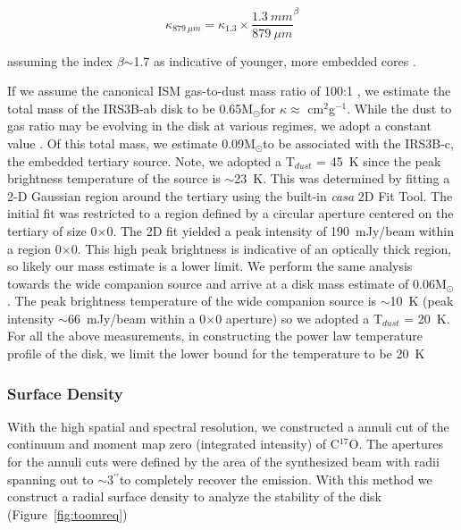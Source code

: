 \documentclass[preprint,12pt]{aastex62}
\newcommand{\cso}{C$^{17}$O}
\renewcommand{\arcsec}{$^{\prime\prime}$}
\newcommand{\ab}{$\sim$}
\newcommand{\solm}{M$_{\odot}$}
\begin{document}
\begin{equation}
    \kappa_{879~\mu m} = \kappa_{1.3}\times\frac{1.3~mm}{879~\mu m}^{\beta}
\end{equation}

assuming the index $\beta$\ab1.7 as indicative of younger, more embedded cores \citep{1994AA...291..943O}.

If we assume the canonical ISM gas-to-dust mass ratio of 100:1 \citep{1978ApJ...224..132B}, we estimate the total mass of the IRS3B-ab disk to be 0.65\solm\space for $\kappa\approx$ cm$^2$g$^{-1}$. While the dust to gas ratio may be evolving in the disk at various regimes, we adopt a constant value \citep{2014ApJ...788...59W}. Of this total mass, we estimate 0.09\solm to be associated with the IRS3B-c, the embedded tertiary source. Note, we adopted a T$_{dust}$ = 45~K since the peak brightness temperature of the source is \ab23~K. This was determined by fitting a 2-D Gaussian region around the tertiary using the built-in \textit{casa} 2D Fit Tool. The initial fit was restricted to a region defined by a circular aperture centered on the tertiary of size 0$\times$0. The 2D fit yielded a peak intensity of 190~mJy/beam within a region 0$\times$0. This high peak brightness is indicative of an optically thick region, so likely our mass estimate is a lower limit. We perform the same analysis towards the wide companion source and arrive at a disk mass estimate of 0.06\solm. The peak brightness temperature of the wide companion source is \ab10~K (peak intensity \ab66~mJy/beam within a 0$\times$0 aperture) so we adopted a T$_{dust}$ = 20~K. For all the above measurements, in constructing the power law temperature profile of the disk, we limit the lower bound for the temperature to be 20~K 


\subsubsection{Surface Density}

With the high spatial and spectral resolution, we constructed a annuli cut of the continuum and moment map zero (integrated intensity) of \cso. The apertures for the annuli cuts were defined by the area of the synthesized beam with radii spanning out to \ab3\arcsec\space to completely recover the emission. With this method we construct a radial surface density to analyze the stability of the disk (Figure~\ref{fig:toomreq})
\end{document}
